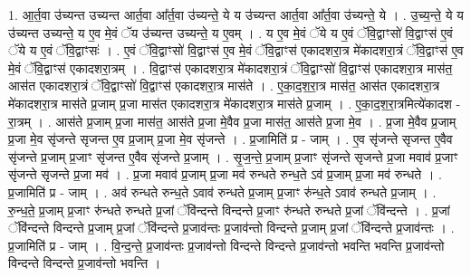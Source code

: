 \documentclass[17pt]{extarticle}
\begin{document}
1. आ॒र्त॒वा उ॑च्यन्त उच्यन्त आर्त॒वा आ᳚र्त॒वा उ॑च्यन्ते॒ ये य उ॑च्यन्त आर्त॒वा आ᳚र्त॒वा उ॑च्यन्ते॒ ये । . उ॒च्य॒न्ते॒ ये य उ॑च्यन्त उच्यन्ते॒ य ए॒व मे॒वं ॅय उ॑च्यन्त उच्यन्ते॒ य ए॒वम् । . य ए॒व मे॒वं ॅये य ए॒वं ॅवि॒द्वाꣳसो॑ वि॒द्वाꣳस॑ ए॒वं ॅये य ए॒वं ॅवि॒द्वाꣳसः॑ । . ए॒वं ॅवि॒द्वाꣳसो॑ वि॒द्वाꣳस॑ ए॒व मे॒वं ॅवि॒द्वाꣳस॑ एकादशरा॒त्र मे॑कादशरा॒त्रं ॅवि॒द्वाꣳस॑ ए॒व मे॒वं ॅवि॒द्वाꣳस॑ एकादशरा॒त्रम् । . वि॒द्वाꣳस॑ एकादशरा॒त्र मे॑कादशरा॒त्रं ॅवि॒द्वाꣳसो॑ वि॒द्वाꣳस॑ एकादशरा॒त्र मास॑त॒ आस॑त एकादशरा॒त्रं ॅवि॒द्वाꣳसो॑ वि॒द्वाꣳस॑ एकादशरा॒त्र मास॑ते । . ए॒का॒द॒श॒रा॒त्र मास॑त॒ आस॑त एकादशरा॒त्र मे॑कादशरा॒त्र मास॑ते प्र॒जाम् प्र॒जा मास॑त एकादशरा॒त्र मे॑कादशरा॒त्र मास॑ते प्र॒जाम् । . ए॒का॒द॒श॒रा॒त्रमित्ये॑कादश - रा॒त्रम् । . आस॑ते प्र॒जाम् प्र॒जा मास॑त॒ आस॑ते प्र॒जा मे॒वैव प्र॒जा मास॑त॒ आस॑ते प्र॒जा मे॒व । . प्र॒जा मे॒वैव प्र॒जाम् प्र॒जा मे॒व सृ॑जन्ते सृजन्त ए॒व प्र॒जाम् प्र॒जा मे॒व सृ॑जन्ते । . प्र॒जामिति॑ प्र - जाम् । . ए॒व सृ॑जन्ते सृजन्त ए॒वैव सृ॑जन्ते प्र॒जाम् प्र॒जाꣳ सृ॑जन्त ए॒वैव सृ॑जन्ते प्र॒जाम् । . सृ॒ज॒न्ते॒ प्र॒जाम् प्र॒जाꣳ सृ॑जन्ते सृजन्ते प्र॒जा मवाव॑ प्र॒जाꣳ सृ॑जन्ते सृजन्ते प्र॒जा मव॑ । . प्र॒जा मवाव॑ प्र॒जाम् प्र॒जा मव॑ रुन्धते रुन्ध॒ते ऽव॑ प्र॒जाम् प्र॒जा मव॑ रुन्धते । . प्र॒जामिति॑ प्र - जाम् । . अव॑ रुन्धते रुन्ध॒ते ऽवाव॑ रुन्धते प्र॒जाम् प्र॒जाꣳ रु॑न्ध॒ते ऽवाव॑ रुन्धते प्र॒जाम् । . रु॒न्ध॒ते॒ प्र॒जाम् प्र॒जाꣳ रु॑न्धते रुन्धते प्र॒जां ॅवि॑न्दन्ते विन्दन्ते प्र॒जाꣳ रु॑न्धते रुन्धते प्र॒जां ॅवि॑न्दन्ते । . प्र॒जां ॅवि॑न्दन्ते विन्दन्ते प्र॒जाम् प्र॒जां ॅवि॑न्दन्ते प्र॒जाव॑न्तः प्र॒जाव॑न्तो विन्दन्ते प्र॒जाम् प्र॒जां ॅवि॑न्दन्ते प्र॒जाव॑न्तः । . प्र॒जामिति॑ प्र - जाम् । . वि॒न्द॒न्ते॒ प्र॒जाव॑न्तः प्र॒जाव॑न्तो विन्दन्ते विन्दन्ते प्र॒जाव॑न्तो भवन्ति भवन्ति प्र॒जाव॑न्तो विन्दन्ते विन्दन्ते प्र॒जाव॑न्तो भवन्ति । \newline
\end{document}
